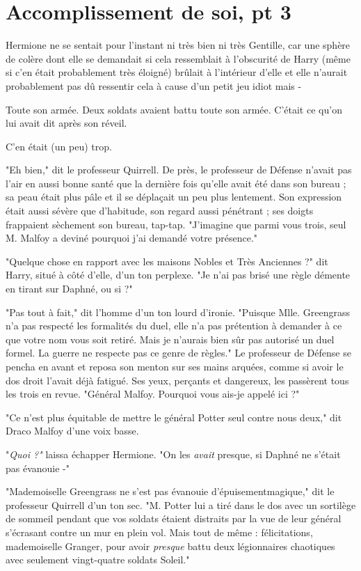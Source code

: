 
\chapter{Accomplissement de soi, pt 3}

Hermione ne se sentait pour l'instant ni très bien ni très Gentille, car une sphère de colère dont elle se demandait si cela ressemblait à l'obscurité de Harry (même si c'en était probablement très éloigné) brûlait à l'intérieur d'elle et elle n'aurait probablement pas dû ressentir cela à cause d'un petit jeu idiot mais -

Toute son armée. Deux soldats avaient battu toute son armée. C'était ce qu'on lui avait dit après son réveil.

C'en était (un peu) trop.

"Eh bien," dit le professeur Quirrell. De près, le professeur de Défense n'avait pas l'air en aussi bonne santé que la dernière fois qu'elle avait été dans son bureau ; sa peau était plus pâle et il se déplaçait un peu plus lentement. Son expression était aussi sévère que d'habitude, son regard aussi pénétrant ; ses doigts frappaient sèchement son bureau, tap-tap. "J'imagine que parmi vous trois, seul M. Malfoy a deviné pourquoi j'ai demandé votre présence."

"Quelque chose en rapport avec les maisons Nobles et Très Anciennes ?" dit Harry, situé à côté d'elle, d'un ton perplexe. "Je n'ai pas brisé une règle démente en tirant sur Daphné, ou si ?"

"Pas tout à fait," dit l'homme d'un ton lourd d'ironie. "Puisque Mlle. Greengrass n'a pas respecté les formalités du duel, elle n'a pas prétention à demander à ce que votre nom vous soit retiré. Mais je n'aurais bien sûr pas autorisé un duel formel. La guerre ne respecte pas ce genre de règles." Le professeur de Défense se pencha en avant et reposa son menton sur ses mains arquées, comme si avoir le dos droit l'avait déjà fatigué. Ses yeux, perçants et dangereux, les passèrent tous les trois en revue. "Général Malfoy. Pourquoi vous ais-je appelé ici ?"

"Ce n'est plus équitable de mettre le général Potter seul contre nous deux," dit Draco Malfoy d'une voix basse.

"\emph{Quoi ?" } laissa échapper Hermione. "On les \emph{avait}  presque, si Daphné ne s'était pas évanouie -"

"Mademoiselle Greengrass ne s'est pas évanouie d'épuisementmagique," dit le professeur Quirrell d'un ton sec. "M. Potter lui a tiré dans le dos avec un sortilège de sommeil pendant que vos soldats étaient distraits par la vue de leur général s'écrasant contre un mur en plein vol. Mais tout de même : félicitations, mademoiselle Granger, pour avoir \emph{presque}  battu deux légionnaires chaotiques avec seulement vingt-quatre soldats Soleil."

